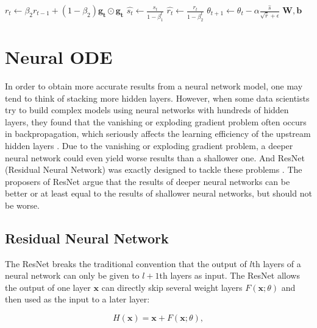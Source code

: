\documentclass[
	parskip, 			   %
	twoside, 			   %
	DIV=14, 			   %
	BCOR=15.0mm, 		   %
	headsepline, 		   %
	open=right, 		   %
	captions=tableheading, %
	bibliography=totoc,    %
	numbers=noenddot       %
]{scrreprt}
\begin{document}
\begin{algorithm}[h!]
\begin{algorithmic}
    \State $r_t \gets \beta_2 r_{t-1} + (1-\beta_2) \mathbf{g_t} \odot \mathbf{g_t}$ 
    \State {}
    \State $\hat{s_t} \gets \frac{s_t}{1-\beta_1^t}$ 
    \State $\hat{r_t} \gets \frac{r_t}{1-\beta_2^t}$ 
    \State {}
    \State $\theta_{t+1} \gets \theta_{t} - \alpha \frac{\hat{s}}{\sqrt{\hat{r}} + \epsilon}$ 
    \State {}
    \EndWhile
    \State \Return $\mathbf{W}, \mathbf{b}$ 
    \end{algorithmic}
\end{algorithm}


\clearpage
\chapter{Neural ODE}
In order to obtain more accurate results from a neural network model, one may tend to think of stacking more hidden layers. However, when some data scientists try to build complex models using neural networks with hundreds of hidden layers, they found that the vanishing or exploding gradient problem often occurs in backpropagation, which seriously affects the learning efficiency of the upstream hidden layers \cite{glorot2010understanding}. Due to the vanishing or exploding gradient problem, a deeper neural network could even yield worse results than a shallower one. And ResNet (Residual Neural Network) was exactly designed to tackle these problems \cite{he2016deep}. The proposers of ResNet argue that the results of deeper neural networks can be better or at least equal to the results of shallower neural networks, but should not be worse.

\section{Residual Neural Network}
The ResNet breaks the traditional convention that the output of $l$th layers of a neural network can only be given to $l+1$th layers as input. The ResNet allows the output of one layer $\mathbf{x}$ can directly skip several weight layers $F(\mathbf{x};\theta)$ and then used as the input to a later layer:

\begin{equation}
    \label{eq:ResNet}
    H(\mathbf{x})=\mathbf{x}+F(\mathbf{x};\theta),
\end{equation}
\end{document}
